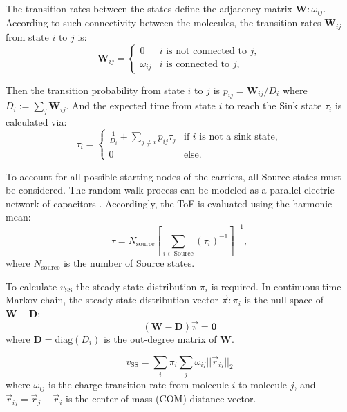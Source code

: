 \documentclass[%
 reprint,
 amsmath,amssymb,
 aps,
]{revtex4-2}
\begin{document}
The transition rates between the states define the adjacency matrix $\mathbf{W}:\omega_{ij}$.
According to such connectivity between the molecules, the transition rates $\mathbf{W}_{ij}$ from state $i$ to $j$ is:
\begin{equation}\label{eq:transition_rates}
	\mathbf{W}_{ij} =
	\begin{cases}
	     0			&  i \text{ is not connected to } j,\\
         \omega_{ij}   &  i \text{ is connected to } j,
	\end{cases}
\end{equation}

Then the transition probability from state $i$ to $j$ is $p_{ij} = \mathbf{W}_{ij}/D_i$ where $D_i := \sum_{j} \mathbf{W}_{ij}$.
And the expected time from state $i$ to reach the Sink state $\tau_i$ is calculated via: 
\begin{equation}\label{eq:hitting_time}
	\tau_i = \begin{cases}
		\frac{1}{D_i} + \sum_{j \ne i} p_{ij} \tau_{j} &\text{if $i$ is not a sink state},\\
		0 &\text{else.} 
	\end{cases}
\end{equation} 

To account for all possible starting nodes of the carriers, all Source states must be considered. The random walk process can be modeled as a parallel electric network of capacitors \cite{doyle_random_1984}. Accordingly, the ToF is evaluated using the harmonic mean:
\begin{equation} 
\tau = N_\text{source} \left[\sum_{i \in \text{Source}} (\tau_i)^{-1}\right]^{-1},
\label{eq:ToF}
\end{equation}
where $N_\text{source}$ is the number of Source states.

To calculate $v_\text{SS}$ the steady state distribution $\pi_i$ is required. In continuous time Markov chain, the steady state distribution vector $\vec{\pi}: \pi_i$ is the null-space of $\mathbf{W}-\mathbf{D}$:
\begin{equation}
    (\mathbf{W}-\mathbf{D} )\vec{\pi} = \mathbf{0}
\end{equation}
where $\mathbf{D} = \text{diag}(D_i)$ is the out-degree matrix of $\mathbf{W}$.

\begin{equation}
    v_\text{SS} = \sum_i \pi_i \sum_j \omega_{ij} || \vec{r}_{ij}||_2
\end{equation} 
where $\omega_{ij}$ is the charge transition rate from molecule $i$ to molecule $j$, and $\vec{r}_{ij}=\vec{r}_j - \vec{r}_i$ is the center-of-mass (COM) distance vector. 
\end{document}

